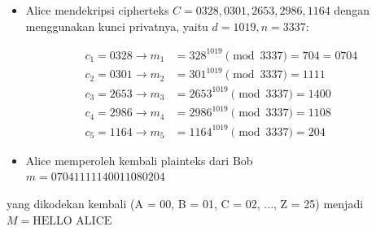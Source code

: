 \documentclass{article}
\begin{document}

\begin{flushright}\end{flushright}

\begin{itemize}
    \item Alice mendekripsi cipherteks $C = 0328, 0301, 2653, 2986, 1164$ dengan menggunakan kunci privatnya, yaitu $d = 1019, n = 3337$:
    
    \begin{align*}
    c_1 = 0328 \rightarrow m_1 &= 328^{1019} \pmod{3337} = 704 = 0704 \\
    c_2 = 0301 \rightarrow m_2 &= 301^{1019} \pmod{3337} = 1111 \\
    c_3 = 2653 \rightarrow m_3 &= 2653^{1019} \pmod{3337} = 1400 \\
    c_4 = 2986 \rightarrow m_4 &= 2986^{1019} \pmod{3337} = 1108 \\
    c_5 = 1164 \rightarrow m_5 &= 1164^{1019} \pmod{3337} = 204
    \end{align*}
    
    \item Alice memperoleh kembali plainteks dari Bob \\ $m = 07041111140011080204$
\end{itemize}

yang dikodekan kembali (A = 00, B = 01, C = 02, ..., Z = 25) menjadi \\ $M = \text{HELLO ALICE}$
\end{document}
